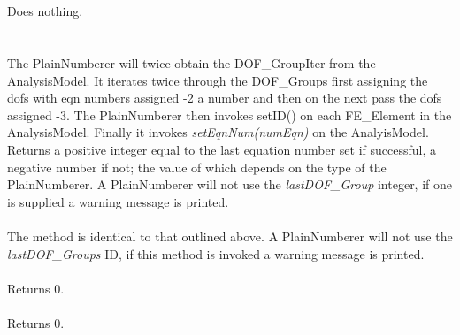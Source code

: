  \\
\\ 
Does nothing. \\

\\
 \\
The PlainNumberer will twice obtain the DOF\_GroupIter from the
AnalysisModel. It iterates twice through the DOF\_Groups first
assigning the dofs with eqn numbers assigned -2 a number and 
then on the next pass the dofs assigned -3. The PlainNumberer then
invokes setID() on each FE\_Element in the
AnalysisModel. Finally it invokes {\em setEqnNum(numEqn)} on the
AnalyisModel. Returns a positive integer equal to the last equation
number set if successful, a negative number if not; the value of 
which depends on the type of the PlainNumberer. A PlainNumberer will
not use the {\em lastDOF\_Group} integer, if one is supplied a warning
message is printed. \\ 

 \\
The method is identical to that outlined above. A PlainNumberer will
not use the {\em lastDOF\_Groups} ID, if this method is invoked a warning
message is printed. \\ 


\\ 
Returns $0$. \\

\\
Returns $0$.





